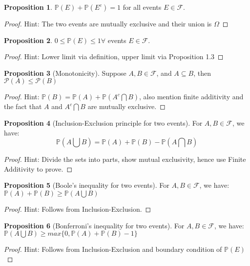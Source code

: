 \documentclass[11pt]{article}
\theoremstyle{definition}
\newtheorem{prop}{Proposition}[section]
\begin{document}
\begin{prop}
$\mathbb{P}(E) + \mathbb{P}(E^c) = 1$ for all events $E \in \mathcal{F}$.
\end{prop}
\begin{proof}
Hint: The two events are mutually exclusive and their union is $\Omega$
\end{proof}

\begin{prop}
$0\leq \mathbb{P}(E) \leq 1 \forall$ events $E \in \mathcal{F}$.
\end{prop}
\begin{proof}
Hint: Lower limit via definition, upper limit via Proposition 1.3
\end{proof}

\begin{prop}[Monotonicity]
Suppose $A, B \in \mathcal{F}$, and $A \subseteq B$, then $\mathcal{P}(A) \leq \mathcal{P}(B)$
\end{prop}
\begin{proof}
Hint: $\mathbb{P}(B) = \mathbb{P}(A) + \mathbb{P}(A^c \bigcap B)$, also mention finite additivity and the fact that $A$ and  $A^c \bigcap B$ are mutually exclusive.
\end{proof}

\begin{prop}[Inclusion-Exclusion principle for two events]
For $A, B \in \mathcal{F}$, we have:
$$
\mathbb{P}(A \bigcup B) = \mathbb{P}(A) + \mathbb{P}(B) - \mathbb{P}(A \bigcap B)
$$
\end{prop}
\begin{proof}
Hint: Divide the sets into parts, show mutual exclusivity, hence use Finite Additivity to prove.
\end{proof}

\begin{prop}[Boole's inequality for two events]
For $A, B \in \mathcal{F}$, we have: $\mathbb{P}(A) + \mathbb{P}(B) \geq \mathbb{P}(A \bigcup B)$
\end{prop}
\begin{proof}
Hint: Follows from Inclusion-Exclusion.
\end{proof}

\begin{prop}[Bonferroni's inequality for two events]
For $A, B \in \mathcal{F}$, we have: $\mathbb{P}(A \bigcup B) \geq max\{0, \mathbb{P}(A)+\mathbb{P}(B)-1\}$
\end{prop}
\begin{proof}
Hint: Follows from Inclusion-Exclusion and boundary condition of $\mathbb{P}(E)$
\end{proof}
\end{document}
